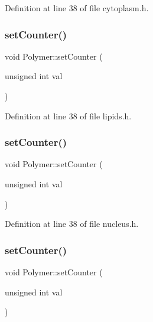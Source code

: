 Definition at line 38 of file cytoplasm.\+h.

\mbox{\label{class_polymer_a7ed6bbe09a570b59f9253d63fd3326d2}} 
\subsubsection{\texorpdfstring{set\+Counter()}{setCounter()}\hspace{0.1cm}{\footnotesize\ttfamily [5/10]}}
{\footnotesize\ttfamily void Polymer\+::set\+Counter (\begin{DoxyParamCaption}\item[{unsigned int}]{val }\end{DoxyParamCaption})\hspace{0.3cm}{\ttfamily [inline]}}



Definition at line 38 of file lipids.\+h.

\mbox{\label{class_polymer_a7ed6bbe09a570b59f9253d63fd3326d2}} 
\subsubsection{\texorpdfstring{set\+Counter()}{setCounter()}\hspace{0.1cm}{\footnotesize\ttfamily [6/10]}}
{\footnotesize\ttfamily void Polymer\+::set\+Counter (\begin{DoxyParamCaption}\item[{unsigned int}]{val }\end{DoxyParamCaption})\hspace{0.3cm}{\ttfamily [inline]}}



Definition at line 38 of file nucleus.\+h.

\mbox{\label{class_polymer_a7ed6bbe09a570b59f9253d63fd3326d2}} 
\subsubsection{\texorpdfstring{set\+Counter()}{setCounter()}\hspace{0.1cm}{\footnotesize\ttfamily [7/10]}}
{\footnotesize\ttfamily void Polymer\+::set\+Counter (\begin{DoxyParamCaption}\item[{unsigned int}]{val }\end{DoxyParamCaption})\hspace{0.3cm}{\ttfamily [inline]}}



